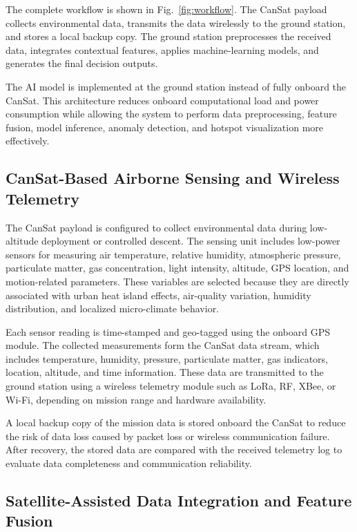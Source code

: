 \documentclass[conference]{IEEEtran}
\begin{document}
The complete workflow is shown in Fig.~\ref{fig:workflow}. The CanSat payload collects environmental data, transmits the data wirelessly to the ground station, and stores a local backup copy. The ground station preprocesses the received data, integrates contextual features, applies machine-learning models, and generates the final decision outputs.

The AI model is implemented at the ground station instead of fully onboard the CanSat. This architecture reduces onboard computational load and power consumption while allowing the system to perform data preprocessing, feature fusion, model inference, anomaly detection, and hotspot visualization more effectively.

\subsection{CanSat-Based Airborne Sensing and Wireless Telemetry}

The CanSat payload is configured to collect environmental data during low-altitude deployment or controlled descent. The sensing unit includes low-power sensors for measuring air temperature, relative humidity, atmospheric pressure, particulate matter, gas concentration, light intensity, altitude, GPS location, and motion-related parameters. These variables are selected because they are directly associated with urban heat island effects, air-quality variation, humidity distribution, and localized micro-climate behavior.

Each sensor reading is time-stamped and geo-tagged using the onboard GPS module. The collected measurements form the CanSat data stream, which includes temperature, humidity, pressure, particulate matter, gas indicators, location, altitude, and time information. These data are transmitted to the ground station using a wireless telemetry module such as LoRa, RF, XBee, or Wi-Fi, depending on mission range and hardware availability.

A local backup copy of the mission data is stored onboard the CanSat to reduce the risk of data loss caused by packet loss or wireless communication failure. After recovery, the stored data are compared with the received telemetry log to evaluate data completeness and communication reliability.

\subsection{Satellite-Assisted Data Integration and Feature Fusion}
\end{document}
